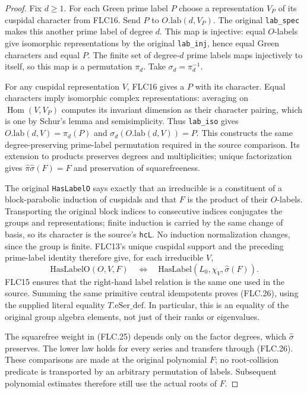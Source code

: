 \begin{proof}
Fix $d\ge1$.  For each Green prime label $P$ choose a
representation $V_P$ of its cuspidal character from FLC16.
Send $P$ to $O.\mathrm{lab}(d,V_P)$.
The original \texttt{lab\_spec} makes this another prime
label of degree $d$.  This map is injective: equal $O$-labels
give isomorphic representations by the original
\texttt{lab\_inj}, hence equal Green characters and equal
$P$.  The finite set of degree-$d$ prime labels maps
injectively to itself, so this map is a permutation $\pi_d$.
Take $\sigma_d=\pi_d^{-1}$.

For any cuspidal representation $V$, FLC16 gives a $P$ with
its character.  Equal characters imply isomorphic complex
representations: averaging on $\operatorname{Hom}(V,V_P)$
computes its invariant dimension as their character pairing,
which is one by Schur's lemma and semisimplicity.
Thus \texttt{lab\_iso} gives
$O.\mathrm{lab}(d,V)=\pi_d(P)$ and
$\sigma_d(O.\mathrm{lab}(d,V))=P$.
This constructs the same degree-preserving prime-label
permutation required in the source comparison.
Its extension to products preserves degrees and
multiplicities; unique factorization gives
$\widehat\pi\widehat\sigma(F)=F$ and preservation of
squarefreeness.

The original \texttt{HasLabelO} says exactly that an
irreducible is a constituent of a block-parabolic induction
of cuspidals and that $F$ is the product of their $O$-labels.
Transporting the original block indices to consecutive
indices conjugates the groups and representations; finite
induction is carried by the same change of basis, so its
character is the source's \texttt{hcL}.  No induction
normalization changes, since the group is finite.
FLC13's unique cuspidal support and the preceding prime-label
identity therefore give, for each irreducible $V$,
\[
 \mathrm{HasLabelO}(O,V,F)
 \quad\Longleftrightarrow\quad
 \mathrm{HasLabel}(L_0,\chi_V,\widehat\sigma(F)).
\]
FLC15 ensures that the right-hand label relation is the
same one used in the source.  Summing the same primitive
central idempotents proves (FLC.26), using the supplied
literal equality $T.\mathrm{eSer\_def}$.
In particular, this is an equality of the original group
algebra elements, not just of their ranks or eigenvalues.

The squarefree weight in (FLC.25) depends only on the factor
degrees, which $\widehat\sigma$ preserves.  The lower law
holds for every series and transfers through (FLC.26).
These comparisons are made at the original polynomial $F$;
no root-collision predicate is transported by an arbitrary
permutation of labels.  Subsequent polynomial estimates
therefore still use the actual roots of $F$.
\end{proof}

